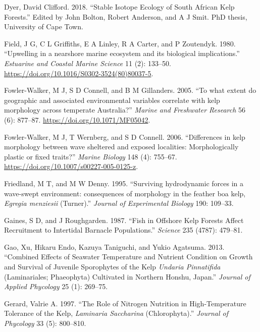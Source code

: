 \documentclass[
  a4paper,
]{article}
\begin{document}
\leavevmode\hypertarget{ref-Dyer2018-rv}{}%
Dyer, David Clifford. 2018. ``Stable Isotope Ecology of South African
Kelp Forests.'' Edited by John Bolton, Robert Anderson, and A J Smit.
PhD thesis, University of Cape Town.

\leavevmode\hypertarget{ref-Field1980a}{}%
Field, J G, C L Griffiths, E A Linley, R A Carter, and P Zoutendyk.
1980. ``Upwelling in a nearshore marine ecosystem and its biological
implications.'' \emph{Estuarine and Coastal Marine Science} 11 (2):
133--50. \url{https://doi.org/10.1016/S0302-3524(80)80037-5}.

\leavevmode\hypertarget{ref-FowlerWalker2005}{}%
Fowler-Walker, M J, S D Connell, and B M Gillanders. 2005. ``To what
extent do geographic and associated environmental variables correlate
with kelp morphology across temperate Australia?'' \emph{Marine and
Freshwater Research} 56 (6): 877--87.
\url{https://doi.org/10.1071/MF05042}.

\leavevmode\hypertarget{ref-FowlerWalker2006}{}%
Fowler-Walker, M J, T Wernberg, and S D Connell. 2006. ``Differences in
kelp morphology between wave sheltered and exposed localities:
Morphologically plastic or fixed traits?'' \emph{Marine Biology} 148
(4): 755--67. \url{https://doi.org/10.1007/s00227-005-0125-z}.

\leavevmode\hypertarget{ref-Friedland1995-vi}{}%
Friedland, M T, and M W Denny. 1995. ``Surviving hydrodynamic forces in
a wave-swept environment: consequences of morphology in the feather boa
kelp, \emph{Egregia menziesii} (Turner).'' \emph{Journal of Experimental
Biology} 190: 109--33.

\leavevmode\hypertarget{ref-Gaines1987-bg}{}%
Gaines, S D, and J Roughgarden. 1987. ``Fish in Offshore Kelp Forests
Affect Recruitment to Intertidal Barnacle Populations.'' \emph{Science}
235 (4787): 479--81.

\leavevmode\hypertarget{ref-gao2013}{}%
Gao, Xu, Hikaru Endo, Kazuya Taniguchi, and Yukio Agatsuma. 2013.
``Combined Effects of Seawater Temperature and Nutrient Condition on
Growth and Survival of Juvenile Sporophytes of the Kelp \emph{Undaria
Pinnatifida} (Laminariales; Phaeophyta) Cultivated in Northern Honshu,
Japan.'' \emph{Journal of Applied Phycology} 25 (1): 269--75.

\leavevmode\hypertarget{ref-gerard1997}{}%
Gerard, Valrie A. 1997. ``The Role of Nitrogen Nutrition in
High-Temperature Tolerance of the Kelp, \emph{Laminaria Saccharina}
(Chlorophyta).'' \emph{Journal of Phycology} 33 (5): 800--810.
\end{document}
